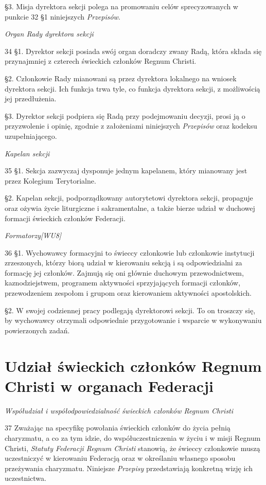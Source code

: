 ﻿\documentclass{report}
\newcommand{\lett}[1]{\lettrine[findent=6pt]{#1}{}}
\newcommand{\ssec}[1]{\vspace{1em}\textit{#1}\vspace{.5em}\nopagebreak}
\begin{document}
\S{}3. Misja dyrektora sekcji polega na promowaniu celów sprecyzowanych w punkcie 32 \S{}1 niniejszych {\em Przepisów}.


\ssec{Organ Rady dyrektora sekcji}


\lett{34} \S{}1. Dyrektor sekcji posiada swój organ doradczy zwany Radą, która składa się przynajmniej z czterech świeckich członków Regnum Christi.


\S{}2. Członkowie Rady mianowani są przez dyrektora lokalnego na wniosek dyrektora sekcji. Ich funkcja trwa tyle, co funkcja dyrektora sekcji, z możliwością jej przedłużenia.


\S{}3. Dyrektor sekcji podpiera się Radą przy podejmowaniu decyzji,  prosi ją o przyzwolenie i opinię, zgodnie z założeniami niniejszych {\em Przepisów} oraz kodeksu uzupełniającego.
 
\ssec{Kapelan sekcji}


\lett{35} \S{}1. Sekcja zazwyczaj dysponuje jednym kapelanem, który mianowany jest przez Kolegium Terytorialne.


\S{}2. Kapelan sekcji, podporządkowany autorytetowi dyrektora sekcji, propaguje oraz  ożywia życie liturgiczne i sakramentalne, a także bierze udział w duchowej formacji świeckich członków Federacji.


\ssec{Formatorzy[WU8] }


\lett{36} \S{}1. Wychowawcy formacyjni to świeccy członkowie lub członkowie instytucji zrzeszonych, którzy biorą udział w kierowaniu sekcją i są odpowiedzialni za formację jej członków. Zajmują się oni głównie duchowym przewodnictwem, kaznodziejstwem, programem aktywności sprzyjających formacji członków, przewodzeniem zespołom i grupom oraz kierowaniem aktywności apostolskich.


\S{}2. W swojej codziennej pracy podlegają dyrektorowi sekcji. To on troszczy się, by wychowawcy otrzymali odpowiednie przygotowanie i wsparcie w wykonywaniu powierzonych zadań.


\chapter{Udział świeckich członków Regnum Christi w organach Federacji}


\ssec{Współudział i współodpowiedzialność świeckich członków Regnum Christi}


\lett{37} Zważając na specyfikę powołania świeckich członków do życia pełnią charyzmatu, a co za tym idzie, do współuczestniczenia w życiu i w misji Regnum Christi, {\em Statuty Federacji Regnum Christi} stanowią, że świeccy członkowie muszą uczestniczyć w kierowaniu Federacją oraz w określaniu własnego sposobu przeżywania charyzmatu. Niniejsze {\em Przepisy} przedstawiają konkretną wizję ich uczestnictwa.
 
\end{document}
